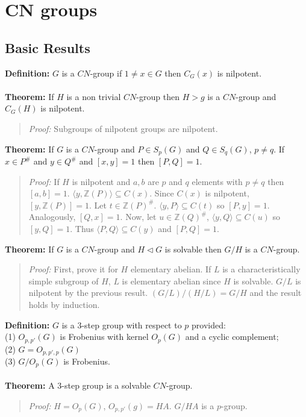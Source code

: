 \chapter{CN groups}
\section {Basic Results}
{\bf Definition:} $G$ is a $CN$-group if $1 \ne x \in G$ then $C_G(x)$ is nilpotent.
\\
\\
{\bf Theorem:} If $H$ is a non trivial $CN$-group then $H>g$ is a $CN$-group and $C_G(H)$ is nilpotent.
\begin{quote}
\emph{Proof:} Subgroups of nilpotent groups are nilpotent.
\end{quote}
{\bf Theorem:} 
If $G$ is a $CN$-group and 
$P \in S_p(G)$ and
$Q \in S_q(G)$, $p \ne q$.  If 
$x \in P^{\#}$ and $y \in Q^{\#}$ and $[x,y]=1$ then $[P,Q]=1$.
\begin{quote}
\emph{Proof:}  If $H$ is nilpotent and $a, b$ are $p$ and $q$ elements with $p \neq q$ then $[a,b] =1$.
$\langle y, {\mathbb Z}(P) \rangle \subseteq C(x)$.  Since $C(x)$ is nilpotent, $[y, {\mathbb Z}(P)] =1$.
Let $t \in {\mathbb Z}(P)^{\#}$. $\langle y, P \rangle \subseteq C(t)$ so $[P,y]=1$.  Analogously,
$[Q,x]=1$.  Now, let $u \in {\mathbb Z}(Q)^{\#}$, $\langle y, Q \rangle \subseteq C(u)$ so $[y, Q] = 1$.
Thus $\langle P, Q \rangle \subseteq C(y)$ and $[P, Q]=1$.
\end{quote}
{\bf Theorem:} 
If $G$ is a $CN$-group and $H \lhd G$ is solvable then $G/H$ is a $CN$-group.
\begin{quote}
\emph{Proof:} First, prove it for $H$ elementary abelian.  If $L$ is a characteristically simple subgroup
of $H$, $L$ is elementary abelian since $H$ is solvable.  $G/L$ is nilpotent by the previous result.
$(G/L)/(H/L) = G/H$ and the result holds by induction.
\end{quote}
{\bf Definition:} $G$ is a $3$-step group with respect to $p$ provided:\\
(1) $O_{p, p'}(G)$ is Frobenius with kernel $O_p(G)$ and a cyclic complement;\\
(2) $G= O_{p,p',p}(G)$ \\
(3) $G/O_p(G)$ is Frobenius.
\\
\\
{\bf Theorem:}  A $3$-step group is a solvable $CN$-group.
\begin{quote}
\emph{Proof:}
$H=O_p(G)$, $O_{p,p'}(g)=HA$.  $G/HA$ is a $p$-group.
\end{quote}
